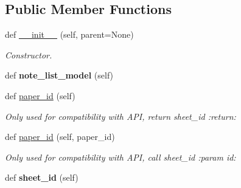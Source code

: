 \subsection*{Public Member Functions}
\begin{DoxyCompactItemize}
\item 
def \hyperlink{classnotes__dock_1_1_gui_notes_dock_a334939c32812918953884a55a65141d2}{\+\_\+\+\_\+init\+\_\+\+\_\+} (self, parent=None)\hypertarget{classnotes__dock_1_1_gui_notes_dock_a334939c32812918953884a55a65141d2}{}\label{classnotes__dock_1_1_gui_notes_dock_a334939c32812918953884a55a65141d2}

\begin{DoxyCompactList}\small\item\em Constructor. \end{DoxyCompactList}\item 
def {\bfseries note\+\_\+list\+\_\+model} (self)\hypertarget{classnotes__dock_1_1_gui_notes_dock_ad73830211865be94f061dc83b9aaf7a4}{}\label{classnotes__dock_1_1_gui_notes_dock_ad73830211865be94f061dc83b9aaf7a4}

\item 
def \hyperlink{classnotes__dock_1_1_gui_notes_dock_adf2fd2edcdf7a1d8f10f3dc63411f055}{paper\+\_\+id} (self)\hypertarget{classnotes__dock_1_1_gui_notes_dock_adf2fd2edcdf7a1d8f10f3dc63411f055}{}\label{classnotes__dock_1_1_gui_notes_dock_adf2fd2edcdf7a1d8f10f3dc63411f055}

\begin{DoxyCompactList}\small\item\em Only used for compatibility with A\+PI, return sheet\+\_\+id \+:return\+: \end{DoxyCompactList}\item 
def \hyperlink{classnotes__dock_1_1_gui_notes_dock_af33f28fb5e09a39771f70f780efd3b11}{paper\+\_\+id} (self, paper\+\_\+id)\hypertarget{classnotes__dock_1_1_gui_notes_dock_af33f28fb5e09a39771f70f780efd3b11}{}\label{classnotes__dock_1_1_gui_notes_dock_af33f28fb5e09a39771f70f780efd3b11}

\begin{DoxyCompactList}\small\item\em Only used for compatibility with A\+PI, call sheet\+\_\+id \+:param id\+: \end{DoxyCompactList}\item 
def {\bfseries sheet\+\_\+id} (self)\hypertarget{classnotes__dock_1_1_gui_notes_dock_afb9b7a5cdc2a340b3d7d55820fb4a253}{}\label{classnotes__dock_1_1_gui_notes_dock_afb9b7a5cdc2a340b3d7d55820fb4a253}


\end{DoxyCompactItemize}
